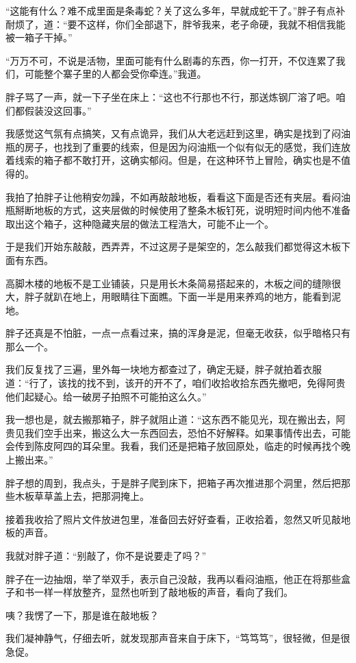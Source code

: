 “这能有什么？难不成里面是条毒蛇？关了这么多年，早就成蛇干了。”胖子有点补耐烦了，道：“要不这样，你们全部退下，胖爷我来，老子命硬，我就不相信我能被一箱子干掉。”

“万万不可，不说是活物，里面可能有什么剧毒的东西，你一打开，不仅连累了我们，可能整个寨子里的人都会受你牵连。”我道。

胖子骂了一声，就一下子坐在床上：“这也不行那也不行，那送炼钢厂溶了吧。咱们都假装没这回事。”

我感觉这气氛有点搞笑，又有点诡异，我们从大老远赶到这里，确实是找到了闷油瓶的房子，也找到了重要的线索，但是因为闷油瓶一个似有似无的感觉，我们连放着线索的箱子都不敢打开，这确实郁闷。但是，在这种环节上冒险，确实也是不值得的。

我拍了拍胖子让他稍安勿躁，不如再敲敲地板，看看这下面是否还有夹层。看闷油瓶掰断地板的方式，这夹层做的时候使用了整条木板钉死，说明短时间内他不准备取出这个箱子，这种隐藏夹层的做法工程浩大，可能不止一个。

于是我们开始东敲敲，西弄弄，不过这房子是架空的，怎么敲我们都觉得这木板下面有东西。

高脚木楼的地板不是工业铺装，只是用长木条简易搭起来的，木板之间的缝隙很大，胖子就趴在地上，用眼睛往下面瞧。下面一半是用来养鸡的地方，能看到泥地。

胖子还真是不怕脏，一点一点看过来，搞的浑身是泥，但毫无收获，似乎暗格只有那么一个。

我们反复找了三遍，里外每一块地方都查过了，确定无疑，胖子就拍着衣服道：“行了，该找的找不到，该开的开不了，咱们收拾收拾东西先撤吧，免得阿贵他们起疑心。给一破房子拍照不可能拍这么久。”

我一想也是，就去搬那箱子，胖子就阻止道：“这东西不能见光，现在搬出去，阿贵见我们空手出来，搬这么大一东西回去，恐怕不好解释。如果事情传出去，可能会传到陈皮阿四的耳朵里。我看，我们还是把箱子放回原处，临走的时候再找个晚上搬出来。”

胖子想的周到，我点头，于是胖子爬到床下，把箱子再次推进那个洞里，然后把那些木板草草盖上去，把那洞掩上。

接着我收拾了照片文件放进包里，准备回去好好查看，正收拾着，忽然又听见敲地板的声音。

我就对胖子道：“别敲了，你不是说要走了吗？”

胖子在一边抽烟，举了举双手，表示自己没敲，我再以看闷油瓶，他正在将那些盒子和书一样一样放整齐，显然也听到了敲地板的声音，看向了我们。

咦？我愣了一下，那是谁在敲地板？

我们凝神静气，仔细去听，就发现那声音来自于床下，“笃笃笃”，很轻微，但是很急促。

